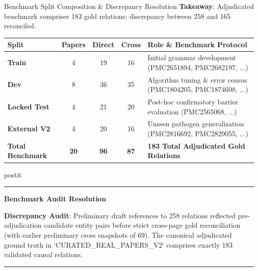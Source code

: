 \documentclass[aspectratio=43,10pt]{beamer}
\newcommand{\card}[4][\linewidth]{%
  \begin{beamercolorbox}[wd=#1,sep=0pt,rounded=false,shadow=false]{postit}%
    {\color{#3}\rule{\linewidth}{1.5pt}}\par
    \colorbox{slatebg}{%
      \begin{minipage}{\dimexpr#1-8pt\relax}%
        \vspace{1.5pt}%
        {\footnotesize\bfseries\color{#3}#2}\vspace{1.5pt}\par%
        {\scriptsize\color{darktext}#4}%
        \vspace{1.5pt}%
      \end{minipage}%
    }%
    \par{\color{bordergray}\rule{\linewidth}{0.6pt}}%
  \end{beamercolorbox}%
}
\begin{document}
\begin{frame}{Benchmark Split Composition \& Discrepancy Resolution}
  \textbf{Takeaway}: Adjudicated benchmark comprises 183 gold relations; discrepancy between 258 and 165 reconciled.
  \vspace{0.08cm}
  \begin{center}
    \scriptsize
    \begin{tabularx}{\linewidth}{lccc>{\raggedright\arraybackslash}X}
      \toprule
      \textbf{\color{navy}Split} & \textbf{\color{navy}Papers} & \textbf{\color{navy}Direct} & \textbf{\color{navy}Cross} & \textbf{\color{navy}Role \& Benchmark Protocol} \\
      \midrule
      \textbf{Train} & 4 & 19 & 16 & Initial grammar development (PMC2651894, PMC2682197, ...) \\
      \textbf{Dev} & 8 & 36 & 35 & Algorithm tuning \& error census (PMC1804205, PMC1874608, ...) \\
      \textbf{Locked Test} & 4 & 21 & 20 & Post-hoc confirmatory barrier evaluation (PMC2565068, ...) \\
      \textbf{External V2} & 4 & 20 & 16 & Unseen pathogen generalization (PMC2816692, PMC2829055, ...) \\
      \midrule
      \textbf{\color{navy}Total Benchmark} & \textbf{20} & \textbf{96} & \textbf{87} & \textbf{183 Total Adjudicated Gold Relations} \\
      \bottomrule
    \end{tabularx}
  \end{center}
  \vspace{0.04cm}
  \card{Benchmark Audit Resolution}{navy}{
    \textbf{Discrepancy Audit}: Preliminary draft references to 258 relations reflected pre-adjudication candidate entity pairs before strict cross-page gold reconciliation (with earlier preliminary cross snapshots of 69). The canonical adjudicated ground truth in `CURATED\_REAL\_PAPERS\_V2` comprises exactly 183 validated causal relations.
  }
\end{frame}
\end{document}
